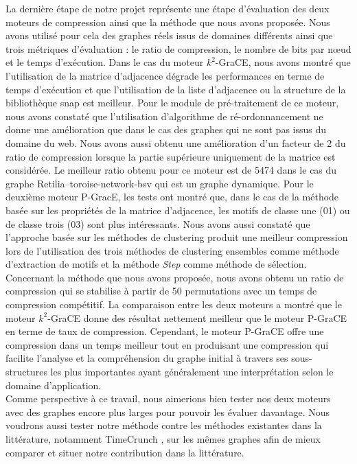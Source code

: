 \documentclass[a4paper,oneside,12pt]{report}
\theoremstyle{definition}
\begin{document}
La dernière étape de notre projet représente une étape d'évaluation des deux moteurs de compression ainsi que la méthode que nous avons proposée. Nous avons utilisé pour cela des graphes réels issus de domaines différents ainsi que trois métriques d'évaluation : le ratio de compression, le nombre de bits par nœud et le temps d'exécution. Dans le cas du moteur $k^2$-GraCE, nous avons montré que l'utilisation de la matrice d'adjacence dégrade les performances en terme de temps d'exécution et que l'utilisation de la liste d'adjacence ou la structure de la bibliothèque \gls{snap} est meilleur. Pour le module de pré-traitement de ce moteur, nous avons constaté que  l'utilisation d'algorithme de ré-ordonnancement  ne donne une amélioration que dans le cas des graphes qui ne sont pas issus du domaine du web. Nous avons aussi obtenu une amélioration d'un facteur de 2 du ratio de compression lorsque la partie supérieure uniquement de la matrice est considérée. Le meilleur ratio obtenu pour ce moteur est de 5474 dans le cas du graphe Retilia--toroise-network-bsv qui est un graphe dynamique.
Pour le deuxième moteur P-GracE, les tests ont montré que, dans le cas de la méthode basée sur les propriétés de la matrice d'adjacence, les motifs de classe une (01) ou de classe trois (03) sont plus intéressants. Nous avons aussi constaté que l'approche basée sur les méthodes de clustering produit une meilleur compression lors de l'utilisation des trois méthodes de clustering ensembles comme méthode d'extraction de motifs et la méthode \textit{Step} comme méthode de sélection. Concernant la méthode que nous avons proposée, nous avons obtenu un ratio de compression qui se stabilise à partir de 50 permutations avec un temps de compression compétitif.  
La comparaison entre les deux moteurs a montré que le moteur $k^2$-GraCE donne des résultat nettement meilleur que le moteur P-GraCE en terme de taux de compression. Cependant, le moteur P-GraCE offre une compression dans un temps meilleur tout en produisant une compression qui facilite l'analyse et la compréhension du graphe initial à travers ses sous-structures les plus importantes ayant généralement une interprétation selon le domaine d'application.  \\
	
	
Comme perspective à ce travail, nous aimerions bien tester nos deux moteurs avec des graphes encore plus larges pour pouvoir les évaluer davantage. Nous voudrons aussi tester notre méthode contre les méthodes existantes dans la littérature, notamment TimeCrunch \citep{shah2015timecrunch}, sur les mêmes graphes afin de mieux comparer et situer notre contribution dans la littérature.
\end{document}
